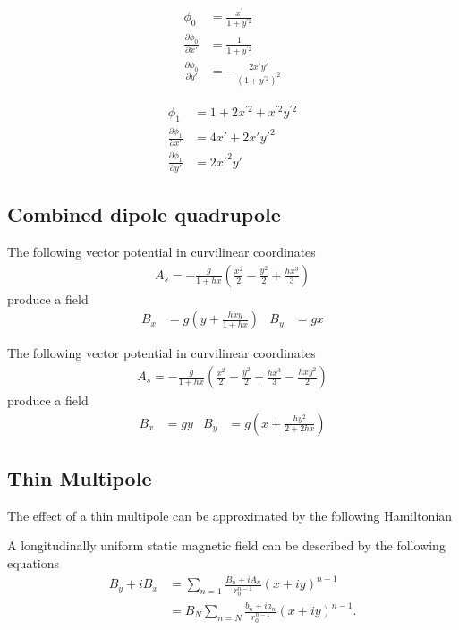 \begin{align}
\phi_0 &= \frac{x^{\prime}}{1+y^{\prime 2}}\\
\frac{\partial \phi_0}{\partial x'} &= \frac{1}{1+y^{\prime 2}}\\
\frac{\partial \phi_0}{\partial y'} &= - \frac{2x'y'}{(1+y^{\prime 2})^2}
\end{align}

\begin{align}
\phi_1 &= 1+2x^{\prime 2}+x^{\prime 2}y^{\prime 2} \\
\frac{\partial \phi_1}{\partial x'} &= 4x' + 2x'y'^2\\
\frac{\partial \phi_1}{\partial y'} &= 2x'^2y'
\end{align}


\subsection{Combined dipole quadrupole}

The following vector potential in curvilinear coordinates
\begin{align}
A_s= -\frac{g}{1+h x}
    \left(\frac{x^2}{2} - \frac{y^2}{2} +
          \frac{h x^3}{3} \right)
\end{align}
produce a field 
\begin{align}
B_x&= g \left(y + \frac{h x y}{1+h x} \right) &
B_y&= g x 
\end{align}

The following vector potential in curvilinear coordinates
\begin{align}
A_s= -\frac{g}{1+h x}
    \left(\frac{x^2}{2} - \frac{y^2}{2} +
          \frac{h x^3}{3} -   \frac{h x y^2}{2} \right)
\end{align}
produce a field 
\begin{align}
B_x&= g y &
B_y&= g \left(x + \frac{h y^2}{2+2 h x} \right) 
\end{align}


\subsection{Thin Multipole}

The effect of a thin multipole can be approximated by the following Hamiltonian

A longitudinally uniform static magnetic field can be described by the following equations
\begin{align}
    B_y+iB_x&=\sum_{n=1}     \frac{B_n+iA_n}{r_0^{n-1}} (x+iy)^{n-1} \\
            &=B_N \sum_{n=N} \frac{b_n+ia_n}{r_0^{n-1}} (x+iy)^{n-1}  .
\end{align}


